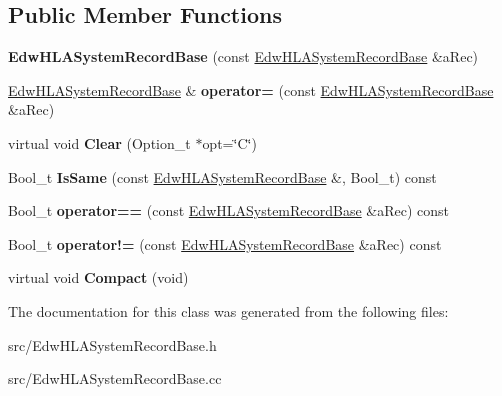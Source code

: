 \subsection*{Public Member Functions}
\begin{DoxyCompactItemize}
\item 
\hypertarget{class_edw_h_l_a_system_record_base_a86b1dcb2d35617f11a7f77b9a962f866}{
{\bfseries EdwHLASystemRecordBase} (const \hyperlink{class_edw_h_l_a_system_record_base}{EdwHLASystemRecordBase} \&aRec)}
\label{class_edw_h_l_a_system_record_base_a86b1dcb2d35617f11a7f77b9a962f866}

\item 
\hypertarget{class_edw_h_l_a_system_record_base_ac601c694c5e9ac22b954258907371b4f}{
\hyperlink{class_edw_h_l_a_system_record_base}{EdwHLASystemRecordBase} \& {\bfseries operator=} (const \hyperlink{class_edw_h_l_a_system_record_base}{EdwHLASystemRecordBase} \&aRec)}
\label{class_edw_h_l_a_system_record_base_ac601c694c5e9ac22b954258907371b4f}

\item 
\hypertarget{class_edw_h_l_a_system_record_base_a5d89f6f4c27cbd1dac5b983cc4195fb3}{
virtual void {\bfseries Clear} (Option\_\-t $\ast$opt=\char`\"{}C\char`\"{})}
\label{class_edw_h_l_a_system_record_base_a5d89f6f4c27cbd1dac5b983cc4195fb3}

\item 
\hypertarget{class_edw_h_l_a_system_record_base_a5016e5e6a61ae856679d10467d2e1c59}{
Bool\_\-t {\bfseries IsSame} (const \hyperlink{class_edw_h_l_a_system_record_base}{EdwHLASystemRecordBase} \&, Bool\_\-t) const }
\label{class_edw_h_l_a_system_record_base_a5016e5e6a61ae856679d10467d2e1c59}

\item 
\hypertarget{class_edw_h_l_a_system_record_base_a04ada74b1dc79475282504014401dd7d}{
Bool\_\-t {\bfseries operator==} (const \hyperlink{class_edw_h_l_a_system_record_base}{EdwHLASystemRecordBase} \&aRec) const }
\label{class_edw_h_l_a_system_record_base_a04ada74b1dc79475282504014401dd7d}

\item 
\hypertarget{class_edw_h_l_a_system_record_base_a85985fbb4523428ab8bfd22a861747e2}{
Bool\_\-t {\bfseries operator!=} (const \hyperlink{class_edw_h_l_a_system_record_base}{EdwHLASystemRecordBase} \&aRec) const }
\label{class_edw_h_l_a_system_record_base_a85985fbb4523428ab8bfd22a861747e2}

\item 
\hypertarget{class_edw_h_l_a_system_record_base_a2dedf0a4def141c33ff11a115afc3444}{
virtual void {\bfseries Compact} (void)}
\label{class_edw_h_l_a_system_record_base_a2dedf0a4def141c33ff11a115afc3444}

\end{DoxyCompactItemize}


The documentation for this class was generated from the following files:\begin{DoxyCompactItemize}
\item 
src/EdwHLASystemRecordBase.h\item 
src/EdwHLASystemRecordBase.cc\end{DoxyCompactItemize}
